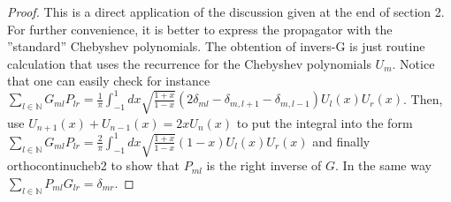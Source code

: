 \documentclass[10pt]{book}
\theoremstyle{break}
\begin{document}
\begin{proof}
This is a direct application of the discussion given at the end of section 2. For further convenience, it is better to express the propagator with the ''standard'' Chebyshev polynomials. The obtention of {invers-G} is just routine calculation that uses the recurrence for the Chebyshev polynomials $U_m$. Notice that one can easily check for instance $\sum_{l\in\mathbb{N}}G_{ml}P_{lr}={\frac{1}{\pi}}\int_{-1}^1dx{\sqrt{\frac{1+x}{1-x}}}(2\delta_{ml}-\delta_{m,l+1}-\delta_{m,l-1})U_l(x)U_r(x)$. Then, use $U_{n+1}(x)+U_{n-1}(x)=2xU_n(x)$ to put the integral into the form $\sum_{l\in\mathbb{N}}G_{ml}P_{lr}=\frac{2}{\pi}\int_{-1}^1dx{\sqrt{\frac{1+x}{1-x}}}(1-x)U_l(x)U_r(x)$ and finally {orthocontinucheb2} to show that $P_{ml}$ is the right inverse of $G$. In the same way $\sum_{l\in\mathbb{N}}P_{ml}G_{lr}=\delta_{mr}$.
\end{proof}
\end{document}

